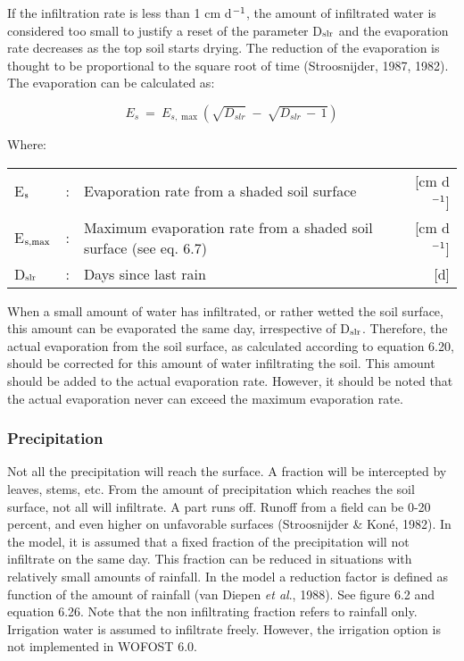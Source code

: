 If the infiltration rate is less than 1 cm d$^{{\rm -1}}$, the amount of infiltrated water is consid\-ered
too small to justify a reset of the parameter D$_{{\rm slr}}$ and the evaporation rate decreases as the
top soil starts drying. The reduction of the evaporation is thought to be proportional to the
square root of time (Stroosnijder, 1987, 1982). The evaporation can be calculated as:

\begin{equation}
E _{s} ~=~ E _{s,\max } ( \sqrt{D _{slr} } ~-~ \sqrt{D _{slr} \, -\, 1} )
\end{equation}

Where:\\[5pt]
\begin{tabularx}{\textwidth}{llXr}
E$_{{\rm s}}$ &:& Evaporation rate from a shaded soil surface  & [cm d$^{{\rm -1}}$]\\
E$_{{\rm s,max}}$ &:& Maximum evaporation rate from a shaded soil
   surface (see eq. 6.7)  & [cm d$^{{\rm -1}}$]\\
D$_{{\rm slr}}$ &:& Days since last rain  & [d]\\
\end{tabularx}

When a small amount of water has infiltrated, or rather wetted the soil surface, this
amount can be evaporated the same day, irrespective of D$_{{\rm slr}}$. Therefore, the actual
evaporation from the soil surface, as calculated according to equation 6.20, should be
corrected for this amount of water infiltrating the soil. This amount should be added to
the actual evaporation rate. However, it should be noted that the actual evaporation never
can exceed the maximum evaporation rate.

\subsubsection{Precipitation}
Not all the precipitation will reach the surface. A fraction will be intercepted by leaves,
stems, etc. From the amount of precipitation which reaches the soil surface, not all will
infiltrate. A part runs off. Runoff from a field can be 0-20 percent, and even higher on
unfavorable surfaces (Stroosnijder \& Kon\'{e}, 1982). In the model, it is assumed that a
fixed fraction of the precipitation will not infiltrate on the same day. This fraction can be
reduced in situations with relatively small amounts of rainfall. In the model a reduction
factor is defined as function of the amount of rainfall (van Diepen {\it et al}., 1988). See 
figure 6.2 and equation 6.26. Note that the non infiltrating fraction refers to rainfall only.
Irrigation water is assumed to infiltrate freely. However, the irrigation option is not
implemented in WOFOST 6.0.

